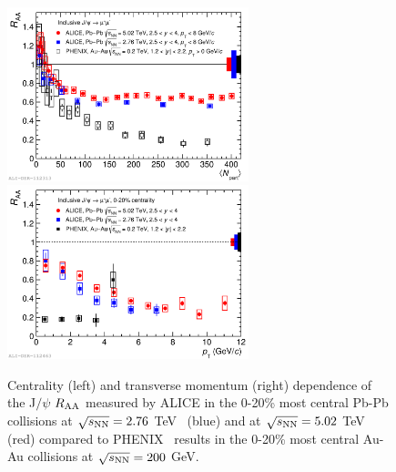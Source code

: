 \begin{figure}[!ht]
  \centering
  \includegraphics[width=7cm]{FigCap1/RaaJPsiAlicePhenix.pdf}
  \includegraphics[width=7cm]{FigCap1/RaaJPsiAlicePhenixVsPt.pdf}
  \caption{Centrality (left) and transverse momentum (right) dependence of the J$/\psi$ $R_{\rm AA}$ measured by ALICE in the 0-20\% most central Pb-Pb collisions at $\sqrt{s_{\rm NN}} = 2.76$ TeV~\cite{Abelev:2013ila} (blue) and at $\sqrt{s_{\rm NN}} = 5.02$ TeV~\cite{Adam:2016rdg} (red) compared to PHENIX~\cite{Adare:2011yf} results in the 0-20\% most central Au-Au collisions at $\sqrt{s_{\rm NN}} = 200$ GeV.}
  \label{fig:RaaJPsi}
\end{figure}

